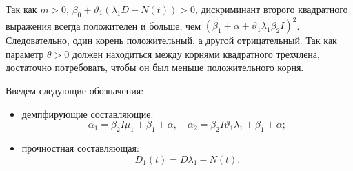 Так как $m>0$, $\beta_{0}+\vartheta _{1} \left(\lambda _{1}D-N(t)\right)>0$, дискриминант второго квадратного выражения всегда положителен и больше, чем $(\beta _{1} +\alpha+\vartheta _{1}\lambda _{1} \beta _{2} I )^2$. Следовательно, один корень положительный, а другой отрицательный. Так как параметр $\theta>0$ должен находиться между корнями квадратного трехчлена, достаточно потребовать, чтобы он был меньше положительного корня. 

\newpage

Введем следующие обозначения:
\begin{itemize}
\item демпфирующие составляющие:
\begin{equation} \label{Velmisov27_2}
\alpha_1=\beta _{2}I \mu _{1} +\beta _{1} +\alpha,\quad\alpha_2=\beta _{2}I \vartheta _{1} \lambda _{1}  +\beta _{1} +\alpha;
\end{equation}

\item 
прочностная составляющая:
\begin{equation} \label{Velmisov27_3}
D_1(t)=D\lambda _{1} -N(t). 
\end{equation}

\end{itemize}


